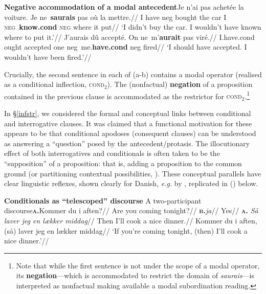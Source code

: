 \pex[aboveglftskip=0pt]\textbf{Negative accommodation of a modal antecedent}\a\begingl\gla Je n'ai pas achetée la voiture. Je ne~\textbf{saurais} pas où la mettre.//
\glb I \textsc{}have \gls{neg} bought the car I \textsc{neg}~\textbf{know.\gls{cond}} \textsc{neg} where it put//
\glft`I didn't buy the car. I wouldn't have known where to put it.'//\endgl
\a\begingl\gla J'aurais dû accepté. On ne~m'\textbf{aurait} pas viré.//
\glb I.have.\gls{cond} ought accepted one \gls{neg}~me.\textbf{have.\gls{cond}} \gls{neg} fired//
\glft`I should have accepted. I wouldn't have been fired.'//\endgl\xe

\noindent Crucially, the second sentence in each of (a-b) contains a modal operator (realised as a conditional inflection, \textsc{cond$ _2 $}). The (nonfactual) \textbf{negation} of a proposition contained in the previous clause is accommodated as the restrictor for \textsc{cond$ _2 $}.\footnote{Note that while the first sentence is not under the scope of a modal operator, its \textbf{negation}---which is accommodated to restrict the domain of \textit{saurais}---is interpreted as nonfactual making available a modal subordination reading.}

In \S\thinspace\ref{infstr}, we considered the formal and conceptual links between conditional and interrogative clauses. It was claimed that a functional motivation for these appears to be that conditional apodoses (consequent clauses) can be understood as answering a ``question'' posed by the antecedent/protasis. The illocutionary effect of both interrogatives and conditionals is often taken to be the ``supposition'' of a proposition: that is, adding a proposition to the common ground (or partitioning contextual possibilities, \citealp[see][]{Starr2010}).
These conceptual parallels have clear linguistic reflexes, shown clearly for Danish, \textit{e.g.} by \citet[100-2]{Harder1995}, replicated in () below.

\pex[aboveglftskip=0pt]\textbf{Conditionals as ``telescoped'' discourse}\a\textup{ A two-participant discourse}\beginsubsub\b{\textsc{\textbf{a.}}}\begingl\gla Kommer du i aften?//
\glft Are you coming tonight?//\endgl
\b{\textbf{\textsc{b.}}}\begingl\gla \textit{ja}//
\glft Yes//\endgl
\b{\textbf{\textsc{a.}}}\begingl\gla\textit{ Så laver jeg en lækker middag}//
\glft Then I'll cook a nice dinner.//\endgl\endsubsub
\a\begingl{}\gla Kommer du i aften, (så) laver jeg en lækker middag//
\glft `If you're coming tonight, (then) I'll cook a nice dinner.'//\endgl
\xe

